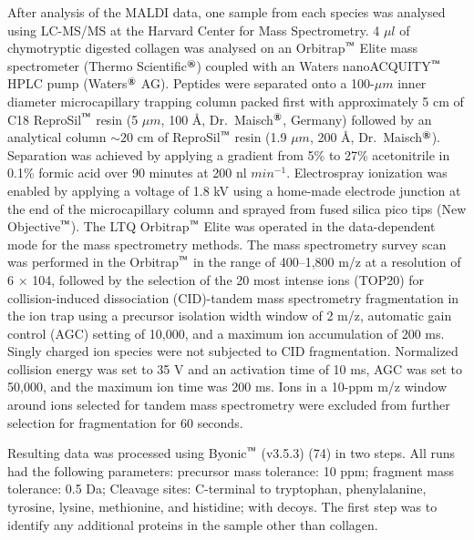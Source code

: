 \documentclass[preprint, 3p, authoryear]{elsarticle} %
\begin{document}
After analysis of the MALDI data, one sample from each species was analysed using LC-MS/MS at the Harvard Center for Mass Spectrometry. 4 \(\mu l\) of chymotryptic digested collagen was analysed on an Orbitrap\(^\text{\texttrademark}\) Elite mass spectrometer (Thermo Scientific\(^\text{\textregistered}\)) coupled with an Waters nanoACQUITY\(^\text{\texttrademark}\) HPLC pump (Waters\(^\text{\textregistered}\) AG). Peptides were separated onto a 100-\(\mu m\) inner diameter microcapillary trapping column packed first with approximately 5 cm of C18 ReproSil\(^\text{\texttrademark}\) resin (5 \(\mu m\), 100 Å, Dr.~Maisch\(^\text{\textregistered}\), Germany) followed by an analytical column \(\sim 20\) cm of ReproSil\(^\text{\texttrademark}\) resin (1.9 \(\mu m\), 200 Å, Dr.~Maisch\(^\text{\textregistered}\)). Separation was achieved by applying a gradient from 5\% to 27\% acetonitrile in 0.1\% formic acid over 90 minutes at 200 nl \(min ^{-1}\). Electrospray ionization was enabled by applying a voltage of 1.8 kV using a home-made electrode junction at the end of the microcapillary column and sprayed from fused silica pico tips (New Objective\(^\text{\texttrademark}\)). The LTQ Orbitrap\(^\text{\texttrademark}\) Elite was operated in the data-dependent mode for the mass spectrometry methods. The mass spectrometry survey scan was performed in the Orbitrap\(^\text{\texttrademark}\) in the range of 400--1,800 m/z at a resolution of 6 × 104, followed by the selection of the 20 most intense ions (TOP20) for collision-induced dissociation (CID)-tandem mass spectrometry fragmentation in the ion trap using a precursor isolation width window of 2 m/z, automatic gain control (AGC) setting of 10,000, and a maximum ion accumulation of 200 ms. Singly charged ion species were not subjected to CID fragmentation. Normalized collision energy was set to 35 V and an activation time of 10 ms, AGC was set to 50,000, and the maximum ion time was 200 ms. Ions in a 10-ppm m/z window around ions selected for tandem mass spectrometry were excluded from further selection for fragmentation for 60 seconds.

Resulting data was processed using Byonic\(^\text{\texttrademark}\) (v3.5.3) (74) in two steps. All runs had the following parameters: precursor mass tolerance: 10 ppm; fragment mass tolerance: 0.5 Da; Cleavage sites: C-terminal to tryptophan, phenylalanine, tyrosine, lysine, methionine, and histidine; with decoys. The first step was to identify any additional proteins in the sample other than collagen.
\end{document}
